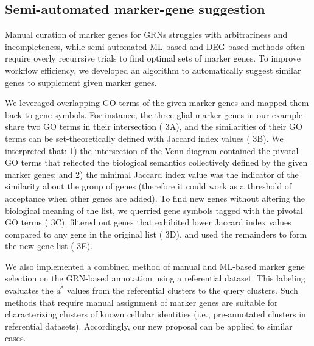 \documentclass{article}
\begin{document}
\subsection*{Semi-automated marker-gene suggestion}
Manual curation of marker genes for GRNs struggles with arbitrariness and incompleteness, while semi-automated 
ML-based and DEG-based methods often require overly recurrsive trials to find optimal sets of marker genes. To 
improve workflow efficiency, we developed an algorithm to automatically suggest similar genes to supplement given 
marker genes. 

We leveraged overlapping GO terms of the given marker genes and mapped them back to gene symbols. For 
instance, the three glial marker genes in our example share two GO terms in their intersection (\figurename{ 3A}), and the 
similarities of their GO terms can be set-theoretically defined with Jaccard index values (\figurename{ 3B}). We interpreted 
that: 1) the intersection of the Venn diagram contained the pivotal GO terms that reflected the biological semantics 
collectively defined by the given marker genes; and 2) the minimal Jaccard index value was the indicator of the 
similarity about the group of genes (therefore it could work as a threshold of acceptance when other genes are 
added). To find new genes without altering the biological meaning of the list, we querried gene symbols tagged 
with the pivotal GO terms (\figurename{ 3C}), filtered out genes that exhibited lower Jaccard index values compared to 
any gene in the original list (\figurename{ 3D}), and used the remainders to form the new gene list (\figurename{ 3E}).

We also implemented a combined method of manual and ML-based marker gene selection on the GRN-based 
annotation using a referential dataset. This labeling evaluates the $d^*$ values from the referential clusters to the query 
clusters. Such methods that require manual assignment of marker genes are suitable for characterizing clusters of 
known cellular identities (i.e., pre-annotated clusters in referential datasets). Accordingly, our new proposal can be 
applied to similar cases.
\end{document}
